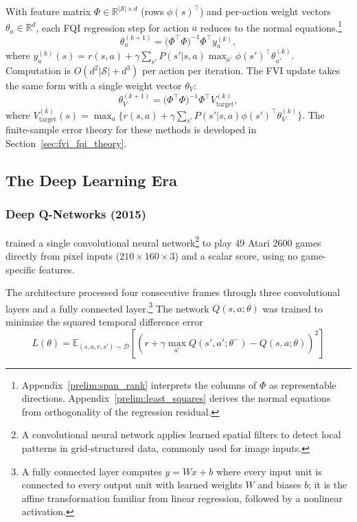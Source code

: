 With feature matrix $\Phi \in \mathbb{R}^{|\mathcal{S}| \times d}$ (rows $\phi(s)^\top$) and per-action weight vectors $\theta_a \in \mathbb{R}^d$, each FQI regression step for action $a$ reduces to the normal equations.\footnote{Appendix~\ref{prelim:span_rank} interprets the columns of $\Phi$ as representable directions. Appendix~\ref{prelim:least_squares} derives the normal equations from orthogonality of the regression residual.}
\begin{equation}
\theta_a^{(k+1)} = \bigl(\Phi^\top \Phi\bigr)^{-1} \Phi^\top y_a^{(k)},
\label{eq:fqi_normal}
\end{equation}
where $y_a^{(k)}(s) = r(s,a) + \gamma \sum_{s'} P(s'|s,a) \max_{a'} \phi(s')^\top \theta_{a'}^{(k)}$. Computation is $O(d^2 |\mathcal{S}| + d^3)$ per action per iteration. The FVI update takes the same form with a single weight vector $\theta_V$:
\begin{equation}
\theta_V^{(k+1)} = \bigl(\Phi^\top \Phi\bigr)^{-1} \Phi^\top V_{\mathrm{target}}^{(k)},
\label{eq:fvi_normal}
\end{equation}
where $V_{\mathrm{target}}^{(k)}(s) = \max_a \bigl\{ r(s,a) + \gamma \sum_{s'} P(s'|s,a) \phi(s')^\top \theta_V^{(k)} \bigr\}$. The finite-sample error theory for these methods is developed in Section~\ref{sec:fvi_fqi_theory}.

\subsection{The Deep Learning Era}

\subsubsection{Deep Q-Networks (2015)}

\citet{mnih2015} trained a single convolutional neural network\footnote{A convolutional neural network applies learned spatial filters to detect local patterns in grid-structured data, commonly used for image inputs.} to play 49 Atari 2600 games directly from pixel inputs ($210 \times 160 \times 3$) and a scalar score, using no game-specific features.

The architecture processed four consecutive frames through three convolutional layers and a fully connected layer.\footnote{A fully connected layer computes $y = Wx + b$ where every input unit is connected to every output unit with learned weights $W$ and biases $b$; it is the affine transformation familiar from linear regression, followed by a nonlinear activation.} The network $Q(s, a; \theta)$ was trained to minimize the squared temporal difference error
\begin{equation}
L(\theta) = \mathbb{E}_{(s,a,r,s') \sim \mathcal{D}} \left[ \left( r + \gamma \max_{a'} Q(s', a'; \theta^-) - Q(s, a; \theta) \right)^2 \right]
\end{equation}

